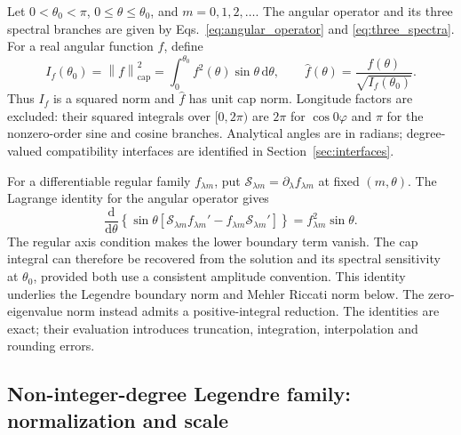 ﻿\documentclass[11pt,a4paper]{article}
\newcommand{\dd}{\mathrm{d}}
\newcommand{\norm}[1]{\left\lVert#1\right\rVert}
\begin{document}
Let $0<\theta_0<\pi$, $0\leq\theta\leq\theta_0$, and $m=0,1,2,\ldots$. The angular operator and its three spectral branches are given by Eqs.~\eqref{eq:angular_operator} and \eqref{eq:three_spectra}. For a real angular function $f$, define
\begin{equation}
 I_f(\theta_0)=\norm{f}_{\mathrm{cap}}^2
 =\int_0^{\theta_0}f^2(\theta)\sin\theta\,\dd\theta,
 \qquad
 \widehat f(\theta)=\frac{f(\theta)}{\sqrt{I_f(\theta_0)}}.
 \label{eq:cap_norm}
\end{equation}
Thus $I_f$ is a squared norm and $\widehat f$ has unit cap norm. Longitude factors are excluded: their squared integrals over $[0,2\pi)$ are $2\pi$ for $\cos0\varphi$ and $\pi$ for the nonzero-order sine and cosine branches. Analytical angles are in radians; degree-valued compatibility interfaces are identified in Section~\ref{sec:interfaces}.

For a differentiable regular family $f_{\lambda m}$, put $\mathcal S_{\lambda m}=\partial_\lambda f_{\lambda m}$ at fixed $(m,\theta)$. The Lagrange identity for the angular operator gives
\begin{equation}
 \frac{\dd}{\dd\theta}\left\{\sin\theta
 \left[\mathcal S_{\lambda m}f_{\lambda m}'
 -f_{\lambda m}\mathcal S_{\lambda m}'\right]\right\}
 =f_{\lambda m}^2\sin\theta.
 \label{eq:common_spectral_norm_identity}
\end{equation}
The regular axis condition makes the lower boundary term vanish. The cap integral can therefore be recovered from the solution and its spectral sensitivity at $\theta_0$, provided both use a consistent amplitude convention. This identity underlies the Legendre boundary norm and Mehler Riccati norm below. The zero-eigenvalue norm instead admits a positive-integral reduction. The identities are exact; their evaluation introduces truncation, integration, interpolation and rounding errors.

\subsection{Non-integer-degree Legendre family: normalization and scale}
\end{document}
